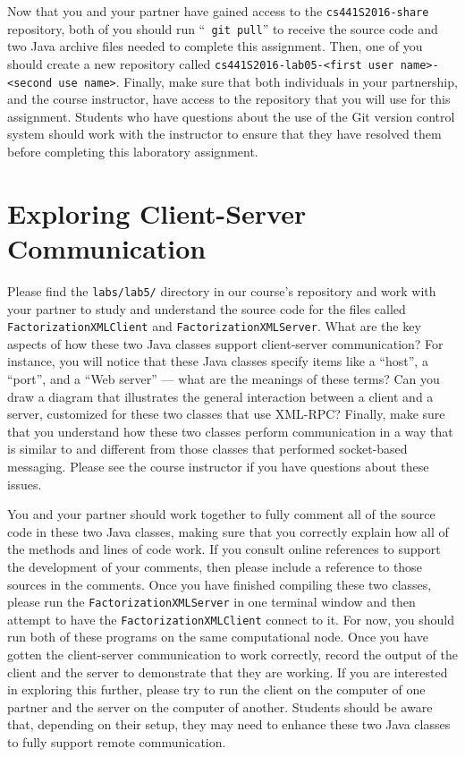 Now that you and your partner have gained access to the {\tt cs441S2016-share} repository, both of you should run ``{\tt
git pull}'' to receive the source code and two Java archive files needed to complete this assignment. Then, one of you
should create a new repository called {\tt cs441S2016-lab05-<first user name>-<second use name>}. Finally, make sure
that both individuals in your partnership, and the course instructor, have access to the repository that you will use
for this assignment. Students who have questions about the use of the Git version control system should work with the
instructor to ensure that they have resolved them before completing this laboratory assignment.

\section*{Exploring Client-Server Communication}

\begin{sloppypar}
  Please find the {\tt labs/lab5/} directory in our course's repository and work with your partner to study and
  understand the source code for the files called {\tt FactorizationXMLClient} and {\tt FactorizationXMLServer}. What
  are the key aspects of how these two Java classes support client-server communication? For instance, you will notice
  that these Java classes specify items like a ``host'', a ``port'', and a ``Web server'' --- what are the meanings of
  these terms? Can you draw a diagram that illustrates the general interaction between a client and a server, customized
  for these two classes that use XML-RPC? Finally, make sure that you understand how these two classes perform
  communication in a way that is similar to and different from those classes that performed socket-based messaging.
  Please see the course instructor if you have questions about these issues.
\end{sloppypar}

You and your partner should work together to fully comment all of the source code in these two Java classes, making sure
that you correctly explain how all of the methods and lines of code work. If you consult online references to support
the development of your comments, then please include a reference to those sources in the comments. Once you have
finished compiling these two classes, please run the {\tt FactorizationXMLServer} in one terminal window and then
attempt to have the {\tt FactorizationXMLClient} connect to it. For now, you should run both of these programs on the
same computational node. Once you have gotten the client-server communication to work correctly, record the output of
the client and the server to demonstrate that they are working. If you are interested in exploring this further, please
try to run the client on the computer of one partner and the server on the computer of another. Students should be aware
that, depending on their setup, they may need to enhance these two Java classes to fully support remote communication.

